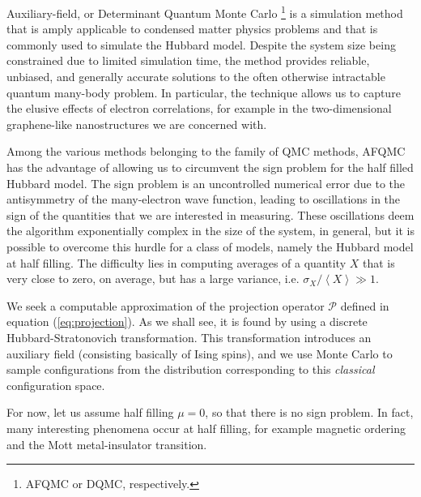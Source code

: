 Auxiliary-field, or Determinant Quantum Monte Carlo \footnote{AFQMC or DQMC, respectively.} is a simulation method that is amply applicable to condensed matter physics problems and that is commonly used to simulate the Hubbard model. Despite the system size being constrained due to limited simulation time, the method provides reliable, unbiased, and generally accurate solutions to the often otherwise intractable quantum many-body problem. In particular, the technique allows us to capture the elusive effects of electron correlations, for example in the two-dimensional graphene-like nanostructures we are concerned with.

Among the various methods belonging to the family of QMC methods, AFQMC has the advantage of  allowing us to circumvent the sign problem for the half filled Hubbard model. The sign problem is an uncontrolled numerical error due to the antisymmetry of the many-electron wave function, leading to oscillations in the sign of the quantities that we are interested in measuring. These oscillations deem the algorithm exponentially complex in the size of the system, in general, but it is possible to overcome this hurdle for a class of models, namely the Hubbard model at half filling. The difficulty lies in computing averages of a quantity $X$ that is very close to zero, on average, but has a large variance, i.e. $\sigma_X / \left\langle X \right\rangle \gg 1$.

We seek a computable approximation of the projection operator $\mathcal{P}$ defined in equation (\ref{eq:projection}). As we shall see, it is found by using a discrete Hubbard-Stratonovich transformation. This transformation introduces an auxiliary field (consisting basically of Ising spins), and we use Monte Carlo to sample configurations from the distribution corresponding to this \emph{classical} configuration space.

For now, let us assume half filling $\mu = 0$, so that there is no sign problem. In fact, many interesting phenomena occur at half filling, for example magnetic ordering and the Mott metal-insulator transition.



\cleardoublepage
